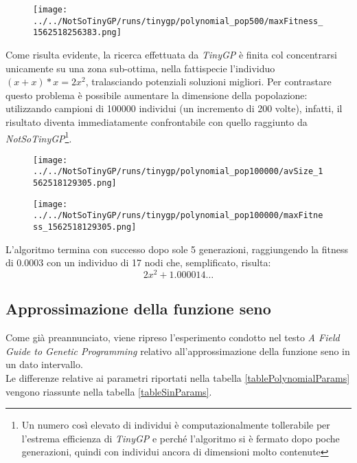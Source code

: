 \documentclass{../llncs}
\newcommand{\labelfig}[1]{\label{fig:#1}}
\begin{document}
\begin{figure}[!htb]
\centering
\texttt{[image: ../../NotSoTinyGP/runs/tinygp/polynomial\_pop500/maxFitness\_1562518256383.png]}
\end{figure}

Come risulta evidente, la ricerca effettuata da \emph{TinyGP} è finita col concentrarsi unicamente su una zona sub-ottima, nella fattispecie l'individuo $(x+x)*x = 2x^2$, tralasciando potenziali soluzioni migliori. Per contrastare questo problema è possibile aumentare la dimensione della popolazione: utilizzando campioni di 100000 individui (un incremento di 200 volte), infatti, il risultato diventa immediatamente confrontabile con quello raggiunto da \emph{NotSoTinyGP}\footnote{Un numero così elevato di individui è computazionalmente tollerabile per l'estrema efficienza di \emph{TinyGP} e perché l'algoritmo si è fermato dopo poche generazioni, quindi con individui ancora di dimensioni molto contenute}.\\

\begin{figure}[!htb]
\centering
\texttt{[image: ../../NotSoTinyGP/runs/tinygp/polynomial\_pop100000/avSize\_1562518129305.png]}
\end{figure}

\begin{figure}[!htb]
\centering
\texttt{[image: ../../NotSoTinyGP/runs/tinygp/polynomial\_pop100000/maxFitness\_1562518129305.png]}
\end{figure}

L'algoritmo termina con successo dopo sole 5 generazioni, raggiungendo la fitness di $0.0003$ con un individuo di 17 nodi che, semplificato, risulta:
\[
2x^2+1.000014\ldots
\]

\subsection{Approssimazione della funzione seno}
Come già preannunciato, viene ripreso l'esperimento condotto nel testo \emph{A Field Guide to Genetic Programming} relativo all'approssimazione della funzione seno in un dato intervallo.\\

Le differenze relative ai parametri riportati nella tabella \ref{tablePolynomialParams} vengono riassunte nella tabella \ref{tableSinParams}.
\end{document}
